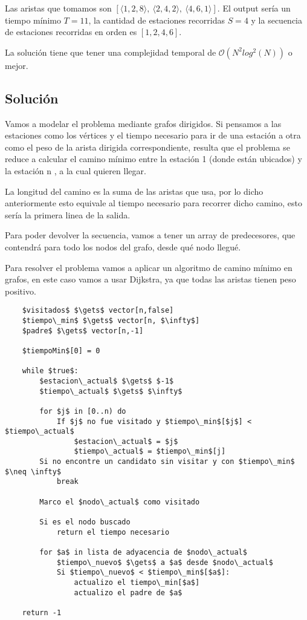 Las aristas que tomamos son $[\langle 1,2,8 \rangle,\ \langle 2,4,2 \rangle,\ \langle 4,6,1 \rangle]$.
El output sería un tiempo mínimo $T=11$, la cantidad de estaciones recorridas $S=4$ y la secuencia de estaciones recorridas en orden es $[1,2,4,6]$.

La solución tiene que tener una complejidad temporal de $\mathcal{O}(N^{2}log^{2}(N))$ o mejor.

\subsection{Solución}

Vamos a modelar el problema mediante grafos dirigidos. Si pensamos a las estaciones como los vértices y el tiempo necesario para ir de una estación a otra como el peso de la arista dirigida correspondiente, resulta que el problema se reduce a calcular el camino mínimo entre la estación 1 (donde están ubicados) y la estación n , a la cual quieren llegar.

La longitud del camino es la suma de las aristas que usa, por lo dicho anteriormente esto equivale al tiempo necesario para recorrer dicho camino, esto sería la primera linea de la salida.

Para poder devolver la secuencia, vamos a tener un array de predecesores, que contendrá para todo los nodos del grafo, desde qué nodo llegué.

Para resolver el problema vamos a aplicar un algoritmo de camino mínimo en grafos, en este caso vamos a usar Dijkstra, ya que todas las aristas tienen peso positivo.

\begin{lstlisting}
    $visitados$ $\gets$ vector[n,false]
    $tiempo\_min$ $\gets$ vector[n, $\infty$]
    $padre$ $\gets$ vector[n,-1]

    $tiempoMin$[0] = 0

    while $true$:
        $estacion\_actual$ $\gets$ $-1$
        $tiempo\_actual$ $\gets$ $\infty$

        for $j$ in [0..n) do
            If $j$ no fue visitado y $tiempo\_min$[$j$] < $tiempo\_actual$
                $estacion\_actual$ = $j$
                $tiempo\_actual$ = $tiempo\_min$[j]
        Si no encontre un candidato sin visitar y con $tiempo\_min$ $\neq \infty$
            break

        Marco el $nodo\_actual$ como visitado

        Si es el nodo buscado
            return el tiempo necesario

        for $a$ in lista de adyacencia de $nodo\_actual$
            $tiempo\_nuevo$ $\gets$ a $a$ desde $nodo\_actual$
            Si $tiempo\_nuevo$ < $tiempo\_min$[$a$]:
                actualizo el tiempo\_min[$a$]
                actualizo el padre de $a$

    return -1
   \end{lstlisting}


